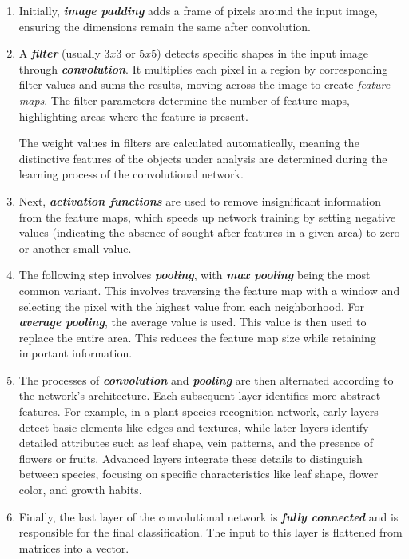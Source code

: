 \begin{enumerate}
    \item   Initially, \textit{\textbf{image padding}} adds a frame of pixels around the input image, ensuring the dimensions remain the same after convolution.
    \item   A \textit{\textbf{filter}} (usually $3x3$ or $5x5$) detects specific shapes in the input image through \textit{\textbf{convolution}}. It multiplies each pixel in a region by corresponding filter values and sums the results, moving across the image to create \textit{feature maps}. The filter parameters determine the number of feature maps, highlighting areas where the feature is present.
    
    The weight values in filters are calculated automatically, meaning the distinctive features of the objects under analysis are determined during the learning process of the convolutional network.
    \item   Next, \textit{\textbf{activation functions}} are used to remove insignificant information from the feature maps, which speeds up network training by setting negative values (indicating the absence of sought-after features in a given area) to zero or another small value.
    \item   The following step involves \textit{\textbf{pooling}}, with \textit{\textbf{max pooling}} being the most common variant. This involves traversing the feature map with a window and selecting the pixel with the highest value from each neighborhood. For \textit{\textbf{average pooling}}, the average value is used. This value is then used to replace the entire area. This reduces the feature map size while retaining important information.
    \item   The processes of \textit{\textbf{convolution}} and \textit{\textbf{pooling}} are then alternated according to the network's architecture. Each subsequent layer identifies more abstract features. For example, in a plant species recognition network, early layers detect basic elements like edges and textures, while later layers identify detailed attributes such as leaf shape, vein patterns, and the presence of flowers or fruits. Advanced layers integrate these details to distinguish between species, focusing on specific characteristics like leaf shape, flower color, and growth habits.
    \item Finally, the last layer of the convolutional network is \textbf{\textit{fully connected}} and is responsible for the final classification. The input to this layer is flattened from matrices into a vector.
\end{enumerate}

